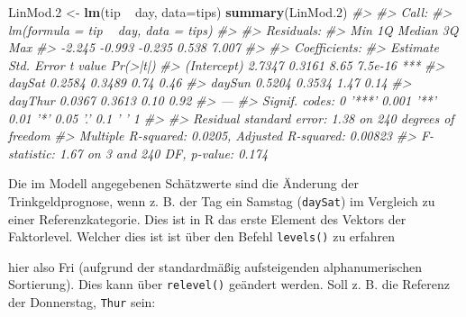 \documentclass[12pt,ngerman,]{book}
\newenvironment{Shaded}{\begin{snugshade}}{\end{snugshade}}
\newcommand{\KeywordTok}[1]{\textcolor[rgb]{0.13,0.29,0.53}{\textbf{{#1}}}}
\newcommand{\DataTypeTok}[1]{\textcolor[rgb]{0.13,0.29,0.53}{{#1}}}
\newcommand{\FloatTok}[1]{\textcolor[rgb]{0.00,0.00,0.81}{{#1}}}
\newcommand{\StringTok}[1]{\textcolor[rgb]{0.31,0.60,0.02}{{#1}}}
\newcommand{\CommentTok}[1]{\textcolor[rgb]{0.56,0.35,0.01}{\textit{{#1}}}}
\newcommand{\NormalTok}[1]{{#1}}
\renewenvironment{Shaded}{\begin{kframe}}{\end{kframe}}
\begin{document}
\begin{Shaded}
\begin{Highlighting}[]
\NormalTok{LinMod}\FloatTok{.2} \NormalTok{<-}\StringTok{ }\KeywordTok{lm}\NormalTok{(tip ~}\StringTok{ }\NormalTok{day, }\DataTypeTok{data=}\NormalTok{tips)}
\KeywordTok{summary}\NormalTok{(LinMod}\FloatTok{.2}\NormalTok{)}
\CommentTok{#> }
\CommentTok{#> Call:}
\CommentTok{#> lm(formula = tip ~ day, data = tips)}
\CommentTok{#> }
\CommentTok{#> Residuals:}
\CommentTok{#>    Min     1Q Median     3Q    Max }
\CommentTok{#> -2.245 -0.993 -0.235  0.538  7.007 }
\CommentTok{#> }
\CommentTok{#> Coefficients:}
\CommentTok{#>             Estimate Std. Error t value Pr(>|t|)    }
\CommentTok{#> (Intercept)   2.7347     0.3161    8.65  7.5e-16 ***}
\CommentTok{#> daySat        0.2584     0.3489    0.74     0.46    }
\CommentTok{#> daySun        0.5204     0.3534    1.47     0.14    }
\CommentTok{#> dayThur       0.0367     0.3613    0.10     0.92    }
\CommentTok{#> ---}
\CommentTok{#> Signif. codes:  0 '***' 0.001 '**' 0.01 '*' 0.05 '.' 0.1 ' ' 1}
\CommentTok{#> }
\CommentTok{#> Residual standard error: 1.38 on 240 degrees of freedom}
\CommentTok{#> Multiple R-squared:  0.0205, Adjusted R-squared:  0.00823 }
\CommentTok{#> F-statistic: 1.67 on 3 and 240 DF,  p-value: 0.174}
\end{Highlighting}
\end{Shaded}

Die im Modell angegebenen Schätzwerte sind die Änderung der
Trinkgeldprognose, wenn z. B. der Tag ein Samstag (\texttt{daySat}) im
Vergleich zu einer Referenzkategorie. Dies ist in R das erste Element
des Vektors der Faktorlevel. Welcher dies ist ist über den Befehl
\texttt{levels()} zu erfahren

\begin{Shaded}
\end{Shaded}

hier also Fri (aufgrund der standardmäßig aufsteigenden alphanumerischen
Sortierung). Dies kann über \texttt{relevel()} geändert werden. Soll z.
B. die Referenz der Donnerstag, \texttt{Thur} sein:

\begin{Shaded}
\end{Shaded}
\end{document}
